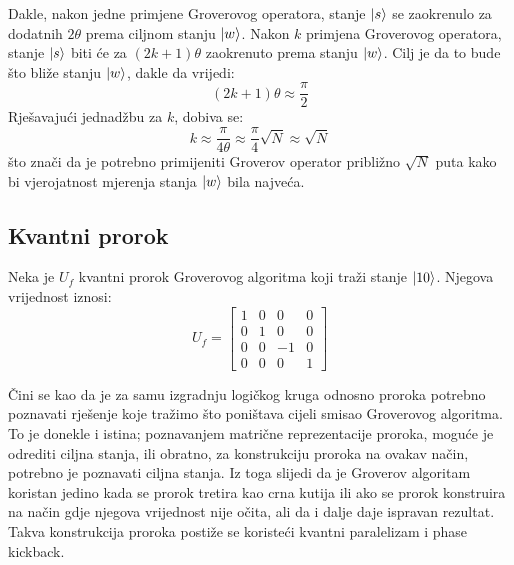 Dakle, nakon jedne primjene Groverovog operatora, stanje $\ket{s}$ se zaokrenulo za dodatnih $2\theta$ prema ciljnom stanju $\ket{w}$. Nakon $k$ primjena Groverovog operatora, stanje $\ket{s}$ biti će za $(2k + 1)\theta$ zaokrenuto prema stanju $\ket{w}$. Cilj je da to bude što bliže stanju $\ket{w}$, dakle da vrijedi:
\[
(2k + 1)\theta \approx \frac{\pi}{2}
\]
Rješavajući jednadžbu za $k$, dobiva se:
\[
k \approx \frac{\pi}{4\theta} \approx \frac{\pi}{4}\sqrt{N} \approx \sqrt{N}
\]
što znači da je potrebno primijeniti Groverov operator približno $\sqrt{N}$ puta kako bi vjerojatnost mjerenja stanja $\ket{w}$ bila najveća.

\subsection{Kvantni prorok}

Neka je $U_f$ kvantni prorok Groverovog algoritma koji traži stanje $\ket{10}$. Njegova vrijednost iznosi:
\[
U_f = \begin{bmatrix}
1 & 0 & 0 & 0 \\
0 & 1 & 0 & 0 \\
0 & 0 & -1 & 0 \\
0 & 0 & 0 & 1
\end{bmatrix}
\]

Čini se kao da je za samu izgradnju logičkog kruga odnosno proroka potrebno poznavati rješenje koje tražimo što poništava cijeli smisao Groverovog algoritma. To je donekle i istina; poznavanjem matrične reprezentacije proroka, moguće je odrediti ciljna stanja, ili obratno, za konstrukciju proroka na ovakav način, potrebno je poznavati ciljna stanja. Iz toga slijedi da je Groverov algoritam koristan jedino kada se prorok tretira kao crna kutija ili ako se prorok konstruira na način gdje njegova vrijednost nije očita, ali da i dalje daje ispravan rezultat. Takva konstrukcija proroka postiže se koristeći kvantni paralelizam i phase kickback.

